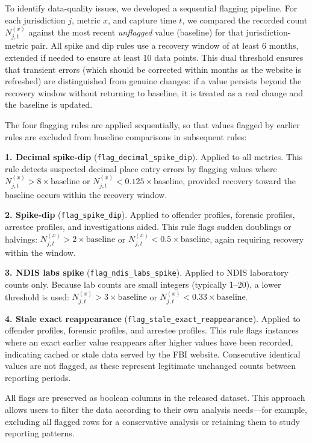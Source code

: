 \documentclass[11pt]{article}
\begin{document}
To identify data-quality issues, we developed a sequential flagging pipeline. For each jurisdiction $j$, metric $x$, and capture time $t$, we compared the recorded count $N_{j,t}^{(x)}$ against the most recent \textit{unflagged} value (baseline) for that jurisdiction-metric pair. All spike and dip rules use a recovery window of at least 6 months, extended if needed to ensure at least 10 data points. This dual threshold ensures that transient errors (which should be corrected within months as the website is refreshed) are distinguished from genuine changes: if a value persists beyond the recovery window without returning to baseline, it is treated as a real change and the baseline is updated.

The four flagging rules are applied sequentially, so that values flagged by earlier rules are excluded from baseline comparisons in subsequent rules:

\textbf{1. Decimal spike-dip} (\texttt{flag\_decimal\_spike\_dip}). Applied to all metrics. This rule detects suspected decimal place entry errors by flagging values where $N_{j,t}^{(x)} > 8 \times \text{baseline}$ or $N_{j,t}^{(x)} < 0.125 \times \text{baseline}$, provided recovery toward the baseline occurs within the recovery window.

\textbf{2. Spike-dip} (\texttt{flag\_spike\_dip}). Applied to offender profiles, forensic profiles, arrestee profiles, and investigations aided. This rule flags sudden doublings or halvings: $N_{j,t}^{(x)} > 2 \times \text{baseline}$ or $N_{j,t}^{(x)} < 0.5 \times \text{baseline}$, again requiring recovery within the window.

\textbf{3. NDIS labs spike} (\texttt{flag\_ndis\_labs\_spike}). Applied to NDIS laboratory counts only. Because lab counts are small integers (typically 1--20), a lower threshold is used: $N_{j,t}^{(x)} > 3 \times \text{baseline}$ or $N_{j,t}^{(x)} < 0.33 \times \text{baseline}$.

\textbf{4. Stale exact reappearance} (\texttt{flag\_stale\_exact\_reappearance}). Applied to offender profiles, forensic profiles, and arrestee profiles. This rule flags instances where an exact earlier value reappears after higher values have been recorded, indicating cached or stale data served by the FBI website. Consecutive identical values are not flagged, as these represent legitimate unchanged counts between reporting periods.

All flags are preserved as boolean columns in the released dataset. This approach allows users to filter the data according to their own analysis needs---for example, excluding all flagged rows for a conservative analysis or retaining them to study reporting patterns.
\end{document}
